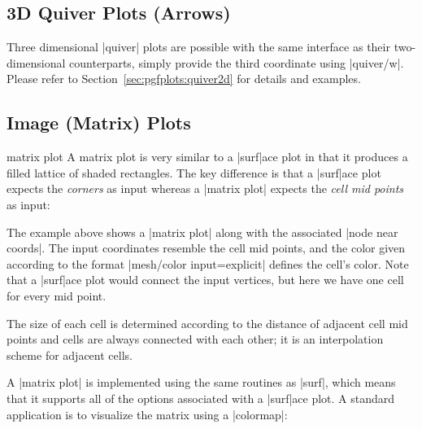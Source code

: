 {{}%

\subsection{3D Quiver Plots (Arrows)}
Three dimensional |quiver| plots are possible with the same interface as their two-dimensional counterparts, simply provide the third coordinate using |quiver/w|. Please refer to Section~\ref{sec:pgfplots:quiver2d} for details and examples.

\subsection{Image (Matrix) Plots}
\label{sec:imagesc}

\begin{plottype}[/pgfplots]{matrix plot}
	A matrix plot is very similar to a |surf|ace plot in that it produces a filled lattice of shaded rectangles. The key difference is that a |surf|ace plot expects the \emph{corners} as input whereas a |matrix plot| expects the \emph{cell mid points} as input:
\begin{codeexample}[]
\end{codeexample}
	The example above shows a |matrix plot| along with the associated |node near coords|. The input coordinates resemble the cell mid points, and the color given according to the format |mesh/color input=explicit| defines the cell's color. Note that a |surf|ace plot would connect the input vertices, but here we have one cell for every mid point.
	
	The size of each cell is determined according to the distance of adjacent cell mid points and cells are always connected with each other; it is an interpolation scheme for adjacent cells. 

	A |matrix plot| is implemented using the same routines as |surf|, which means that it supports all of the options associated with a |surf|ace plot. A standard application is to visualize the matrix using a |colormap|:
\begin{codeexample}[]
\begin{tikzpicture}
	\begin{axis}[enlargelimits=false,colorbar]


\end{axis}
\end{tikzpicture}
\end{codeexample}
\end{plottype}}
